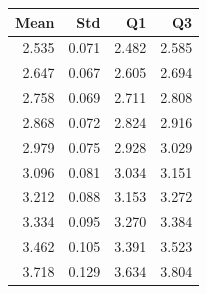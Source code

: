 \begin{tabular}{rrrr}
\toprule
Mean & Std & Q1 & Q3 \\
\midrule
2.535 & 0.071 & 2.482 & 2.585 \\
2.647 & 0.067 & 2.605 & 2.694 \\
2.758 & 0.069 & 2.711 & 2.808 \\
2.868 & 0.072 & 2.824 & 2.916 \\
2.979 & 0.075 & 2.928 & 3.029 \\
3.096 & 0.081 & 3.034 & 3.151 \\
3.212 & 0.088 & 3.153 & 3.272 \\
3.334 & 0.095 & 3.270 & 3.384 \\
3.462 & 0.105 & 3.391 & 3.523 \\
3.718 & 0.129 & 3.634 & 3.804 \\
\bottomrule
\end{tabular}
